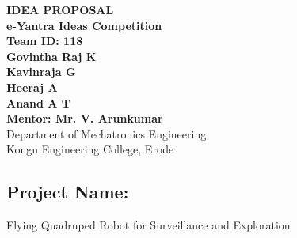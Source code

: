 \documentclass{article}
\begin{document}
	\begin{center}
    
    
		\LARGE{\textbf{IDEA PROPOSAL}} \\
        \vspace{1em}
        \LARGE{\textbf{e-Yantra Ideas Competition}} \\
        \vspace{1em}
        \Large\textbf{Team ID: 118} \\
        \vspace{1em}
        \normalsize\textbf{Govintha Raj K} \\
        \normalsize\textbf{Kavinraja G} \\
        \normalsize\textbf{Heeraj A} \\
        \normalsize\textbf{Anand A T} \\
        \vspace{1em}
        \normalsize\textbf{Mentor: Mr. V. Arunkumar} \\
        \normalsize{Department of Mechatronics Engineering} \\
        \normalsize{Kongu Engineering College, Erode}
     
	\end{center}
	\begin{normalsize}
		\section*{Project Name:}
		 {\large Flying Quadruped Robot for Surveillance and Exploration}
	\end{normalsize}
\end{document}
